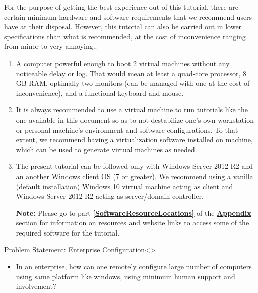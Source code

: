\documentclass[12pt]{extarticle}
\newenvironment{instructionblock}{\Large\bgroup}{\egroup}
\newcommand{\ben}{\begin{enumerate}}
\newcommand{\een}{\end{enumerate}}
\begin{document}
	\vspace{4mm}
	\noindent
	For the purpose of getting the best experience out of this tutorial, there are certain minimum hardware and software requirements that we recommend users have at their disposal. However, this tutorial can also be carried out in lower specifications than what is recommended, at the cost of inconvenience ranging from minor to very annoying..
	
	\ben
	
	\item A computer powerful enough to boot 2 virtual machines without any noticeable delay or log. That would mean at least a quad-core processor, 8 GB RAM, optimally two monitors (can be managed with one at the cost of inconvenience), and a functional keyboard and mouse.
	
	\item It is always recommended to use a virtual machine to run tutorials like the one available in this document so as to not destabilize one's own workstation or personal machine's environment and software configurations. To that extent, we recommend having a virtualization software installed on machine, which can be used to generate virtual machines as needed. 
	
	\item The present tutorial can be followed only with Windows Server 2012 R2 and an another Windows client OS (7 or greater). We recommend using a vanilla (default installation) Windows 10 virtual machine acting as client and Windows Server 2012 R2 acting as server/domain controller. 
	
	\textbf{Note:} Please go to part \textbf{\underline{\ref{SoftwareResourceLocations}}} of the {\textbf{\hyperref[slide 22]{\underline{Appendix}}}} section for information on resources and website links to access some of the required software for the tutorial.
	
	\een
	
	
	




\begin{slide}{Problem Statement: Enterprise Configuration}{\hyperref[slide 3]{\textless}\hyperref[slide 5]{\textgreater}}
	\begin{instructionblock}
		\begin{itemize}
			\item { In an enterprise, how can one remotely configure large number of computers using same platform like windows, using minimum human support and involvement? }
		\end{itemize}
	\end{instructionblock}
\end{slide}
\end{document}
